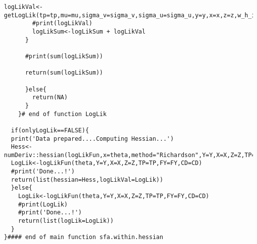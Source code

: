 \begin{lstlisting}[label=Rcode3, caption=R-Code for Numerical Estimation of Hessian Matrix]
        logLikVal<- getLogLik(tp=tp,mu=mu,sigma_v=sigma_v,sigma_u=sigma_u,y=y,x=x,z=z,w_h_it=w_h_it)         
        #print(logLikVal)
        logLikSum<-logLikSum + logLikVal      
      }      
      
      #print(sum(logLikSum))
      
      return(sum(logLikSum))
      
      }else{
        return(NA)       
      }         
    }# end of function LogLik  
  
  if(onlyLogLik==FALSE){
  print('Data prepared....Computing Hessian...')  
  Hess<-numDeriv::hessian(logLikFun,x=theta,method="Richardson",Y=Y,X=X,Z=Z,TP=TP,FY=FY,CD=CD)
  LogLik<-logLikFun(theta,Y=Y,X=X,Z=Z,TP=TP,FY=FY,CD=CD)
  #print('Done...!')
  return(list(hessian=Hess,logLikVal=LogLik))    
  }else{
    LogLik<-logLikFun(theta,Y=Y,X=X,Z=Z,TP=TP,FY=FY,CD=CD)
    #print(LogLik)
    #print('Done...!')
    return(list(logLik=LogLik))    
  }
}#### end of main function sfa.within.hessian

\end{lstlisting}




 
\singlespacing

\doublespacing